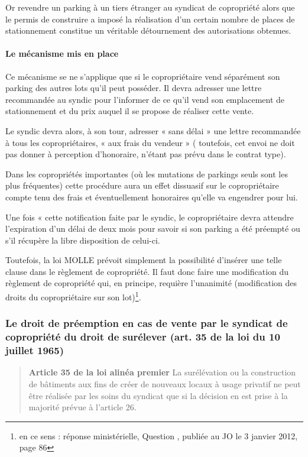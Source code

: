 			Or revendre un parking à un tiers étranger au syndicat de copropriété alors que le permis de construire a
			imposé la réalisation d'un certain nombre de places de stationnement constitue un véritable
			détournement des autorisations obtenues.
			
			\paragraph{Le mécanisme mis en place}
			
			\par Ce mécanisme se ne s'applique que si le copropriétaire vend séparément son parking des autres lots qu'il
			peut posséder. Il devra adresser une lettre recommandée au syndic pour l'informer de ce qu'il vend son
			emplacement de stationnement et du prix auquel il se propose de réaliser cette vente.
			
			Le syndic devra alors, à son tour, adresser « sans délai » une lettre recommandée à tous les
			copropriétaires, « aux frais du vendeur » ( toutefois, cet envoi ne doit pas donner à perception
			d’honoraire, n’étant pas prévu dans le contrat type).
			
			Dans les copropriétés importantes (où les mutations de parkings seuls sont les plus fréquentes) cette
			procédure aura un effet dissuasif sur le copropriétaire compte tenu des frais et éventuellement honoraires
			qu'elle va engendrer pour lui.
			
			Une fois « cette notification faite par le syndic, le copropriétaire devra attendre l'expiration d'un délai de
			deux mois pour savoir si son parking a été préempté ou s’il récupère la libre disposition de celui-ci.
	
			Toutefois, la loi MOLLE prévoit simplement la possibilité d’insérer une telle clause dans le règlement de
			copropriété. Il faut donc faire une modification du règlement de copropriété qui, en principe, requière
			l’unanimité (modification des droits du copropriétaire sur son lot)\footnote{en ce sens : réponse ministérielle, Question \no {}, publiée au JO le 3 janvier 2012, page 86}.
		
		\subsubsection{Le droit de préemption en cas de vente par le syndicat de copropriété du droit de surélever (art. 35 de la loi du 10 juillet 1965)}
	
			\begin{quote}
				\textbf{Article 35 de la loi alinéa premier}\newline
				La surélévation ou la construction de bâtiments aux fins de créer de nouveaux locaux à usage privatif ne
				peut être réalisée par les soins du syndicat que si la décision en est prise à la majorité prévue à l’article 26.
			\end{quote}
			

